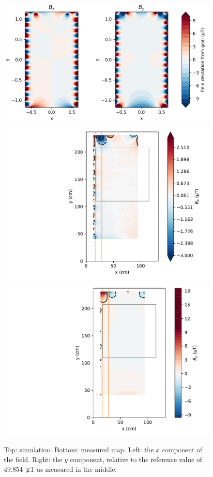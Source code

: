 
\begin{figure}
  \centering
  \includegraphics[width=\linewidth]{gfx/prototype/open_design_Ycoil_field_XY_z0_0.png} \\
  \includegraphics[width=0.45\linewidth,trim={5cm 0 0 0},clip]{gfx/prototype/open_planar_map_Y_Bx.pdf}\quad
  \includegraphics[width=0.45\linewidth,trim={5cm 0 0 0},clip]{gfx/prototype/open_planar_map_Y_By.pdf}
  \caption{Top: simulation. Bottom: measured map. Left: the $x$ component of the field. Right: the $y$ component, relative to the reference value of \SI{49.854}{\micro\tesla} as measured in the middle.
  }\label{fig:prototype_open_design_Ycoil_maps}
\end{figure}

